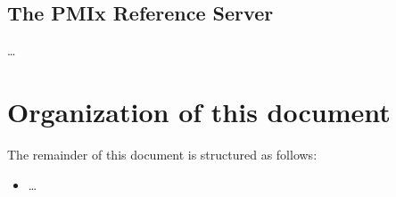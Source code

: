 \subsection{The PMIx Reference Server}

\ldots

\section{Organization of this document}

The remainder of this document is structured as follows:

\begin{itemize}
\item \ldots
\end{itemize}

